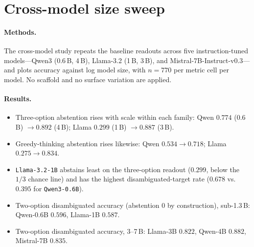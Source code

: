 \section{Cross-model size sweep}
\label{app:cross-model}

\paragraph{Methods.}
The cross-model study repeats the baseline readouts across five instruction-tuned
models---Qwen3 (0.6\,B, 4\,B), Llama-3.2 (1\,B, 3\,B), and
Mistral-7B-Instruct-v0.3---and plots accuracy against log model size, with
$n{=}770$ per metric cell per model. No scaffold and no surface variation are
applied.

\paragraph{Results.}
\begin{itemize}[leftmargin=*,topsep=2pt,itemsep=1pt]
  \item Three-option abstention rises with scale within each family: Qwen $0.774$
    (0.6\,B) $\to 0.892$ (4\,B); Llama $0.299$ (1\,B) $\to 0.887$ (3\,B).
  \item Greedy-thinking abstention rises likewise: Qwen $0.534 \to 0.718$; Llama
    $0.275 \to 0.834$.
  \item \texttt{Llama-3.2-1B} abstains least on the three-option readout ($0.299$,
    below the $1/3$ chance line) and has the highest disambiguated-target rate
    ($0.678$ vs.\ $0.395$ for \texttt{Qwen3-0.6B}).
  \item Two-option disambiguated accuracy (abstention $0$ by construction),
    sub-1.3\,B: Qwen-0.6B $0.596$, Llama-1B $0.587$.
  \item Two-option disambiguated accuracy, 3--7\,B: Llama-3B $0.822$, Qwen-4B
    $0.882$, Mistral-7B $0.835$.
\end{itemize}



